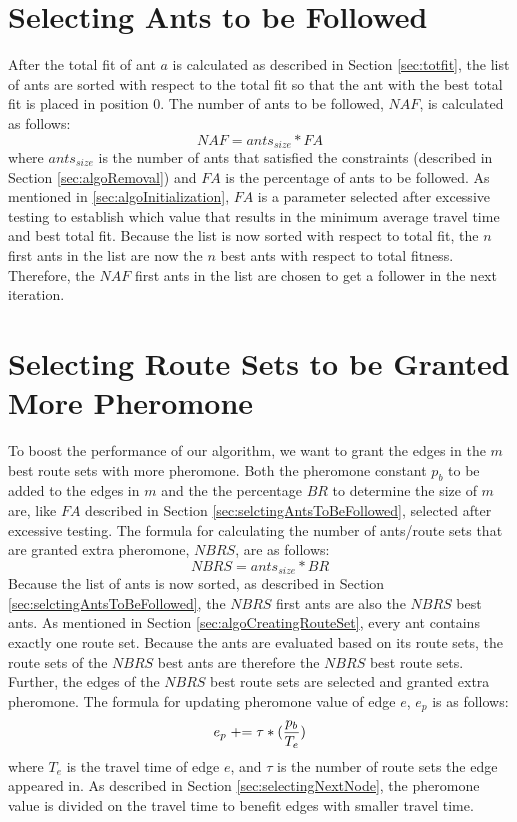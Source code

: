 \section{Selecting Ants to be Followed}
\label{sec:selctingAntsToBeFollowed}
After the total fit of ant $a$ is calculated as described in Section \vref{sec:totfit}, the list of ants are sorted with respect to the total fit so that the ant with the best total fit is placed in position 0. The number of ants to be followed, $NAF$, is calculated as follows:
\newline
$$NAF = ants_{size} * FA$$
\newline 
where $ants_{size}$ is the number of ants that satisfied the constraints (described in Section \vref{sec:algoRemoval}) and $FA$ is the percentage of ants to be followed. As mentioned in \vref{sec:algoInitialization}, $FA$ is a parameter selected after excessive testing to establish which value that results in the minimum average travel time and best total fit. Because the list is now sorted with respect to total fit, the $n$ first ants in the list are now the $n$ best ants with respect to total fitness. Therefore, the $NAF$ first ants in the list are chosen to get a follower in the next iteration. 

\section{Selecting Route Sets to be Granted More Pheromone}
To boost the performance of our algorithm, we want to grant the edges in the $m$ best route sets with more pheromone. Both the pheromone constant $p_b$ to be added to the edges in $m$ and the the percentage $BR$ to determine the size of $m$ are, like $FA$ described in Section \vref{sec:selctingAntsToBeFollowed}, selected after excessive testing. The formula for calculating the number of ants/route sets that are granted extra pheromone, $NBRS$, are as follows:
\newline
$$NBRS = ants_{size} * BR$$
\newline
Because the list of ants is now sorted, as described in Section \vref{sec:selctingAntsToBeFollowed}, the $NBRS$ first ants are also the $NBRS$ best ants. As mentioned in Section \vref{sec:algoCreatingRouteSet}, every ant contains exactly one route set. Because the ants are evaluated based on its route sets, the route sets of the $NBRS$ best ants are therefore the $NBRS$ best route sets. Further, the edges of the $NBRS$ best route sets are selected and granted extra pheromone. The formula for updating pheromone value of edge $e$, $e_p$ is as follows:
\newline
$$e_p \mathrel{+}= \tau*(\frac{p_b}{T_e})$$ 
\newline
where $T_e$ is the travel time of edge $e$, and $\tau$ is the number of route sets the edge appeared in. As described in Section \vref{sec:selectingNextNode}, the pheromone value is divided on the travel time to benefit edges with smaller travel time. 